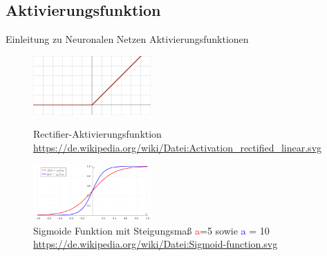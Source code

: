 \documentclass{beamer}
\begin{document}
\subsection{Aktivierungsfunktion}
\begin{frame}[t]{Einleitung zu Neuronalen Netzen}\vspace{4pt}
Aktivierungsfunktionen
\begin{figure}
    \centering
        \includegraphics[width=0.4\textwidth]{Activation_rectified_linear.png}
		\tiny\caption{Rectifier-Aktivierungsfunktion \tiny\url{https://de.wikipedia.org/wiki/Datei:Activation_rectified_linear.svg}}
		\includegraphics[width=0.4\textwidth]{Sigmoid-function.png}
		\tiny\caption{Sigmoide Funktion mit Steigungsmaß
		\textcolor{red}{a}=5 sowie
		\textcolor{blue}{a} = 10 \tiny\url{https://de.wikipedia.org/wiki/Datei:Sigmoid-function.svg}}
\end{figure}
\end{frame}


    
\end{document}
